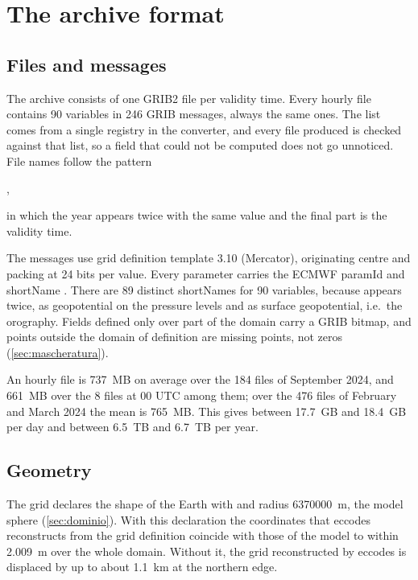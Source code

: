 \chapter{The archive format}
\label{cap:formato}

\section{Files and messages}
\label{sec:file}

The archive consists of one GRIB2 file per validity time. Every hourly file contains 90 variables
in 246 GRIB messages, always the same ones. The list comes from a single registry in the
converter, and every file produced is checked against that list, so a field that could not be
computed does not go unnoticed. File names follow the pattern
\begin{center}
,
\end{center}
\noindent in which the year appears twice with the same value and the final part is the validity
time.

The messages use grid definition template 3.10 (Mercator), originating centre  and
 packing at 24 bits per value. Every parameter carries the ECMWF paramId and
shortName \parencite{paramdb}. There are 89 distinct shortNames for 90 variables, because
 appears twice, as geopotential on the pressure levels and as surface geopotential,
i.e.\ the orography. Fields defined only over part of the domain carry a GRIB bitmap, and points
outside the domain of definition are missing points, not zeros (\cref{sec:mascheratura}).

An hourly file is \SI{737}{MB} on average over the 184 files of September 2024, and
\SI{661}{MB} over the 8 files at 00 UTC among them; over the 476 files of February and March 2024
the mean is \SI{765}{MB}. This gives between \SI{17.7}{GB} and \SI{18.4}{GB} per day and between
\SI{6.5}{TB} and \SI{6.7}{TB} per year.

\section{Geometry}
\label{sec:geometria}

The grid declares the shape of the Earth with  and radius
\SI{6370000}{m}, the model sphere (\cref{sec:dominio}). With this declaration the coordinates that
eccodes reconstructs from the grid definition coincide with those of the model to within
\SI{2.009}{m} over the whole domain. Without it, the grid reconstructed by eccodes is displaced by
up to about \SI{1.1}{km} at the northern edge.


